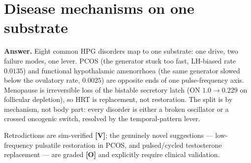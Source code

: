 \documentclass[11pt]{article}
\newcommand{\gradeV}{\textcolor{verified}{\textbf{[V]}}}
\newcommand{\gradeO}{\textcolor{open}{\textbf{[O]}}}
\begin{document}
\section{Disease mechanisms on one substrate}

\textbf{Answer.} Eight common HPG disorders map to one substrate: one drive, two failure modes, one lever.
PCOS (the generator stuck too fast, LH-biased rate $0.0135$) and
functional hypothalamic amenorrhoea (the same generator slowed below the ovulatory rate,
$0.0025$) are opposite ends of one pulse-frequency axis. Menopause is
irreversible loss of the bistable secretory latch (ON $1.0 \to 0.229$ on follicular depletion), so HRT is replacement,
not restoration. The split is by mechanism, not body part: every disorder is either a broken oscillator or a
crossed oncogenic switch, resolved by the temporal-pattern lever.

Retrodictions are sim-verified \gradeV{}; the genuinely novel suggestions --- low-frequency pulsatile
restoration in PCOS, and pulsed/cycled testosterone replacement --- are graded \gradeO{} and explicitly
require clinical validation.
\end{document}
